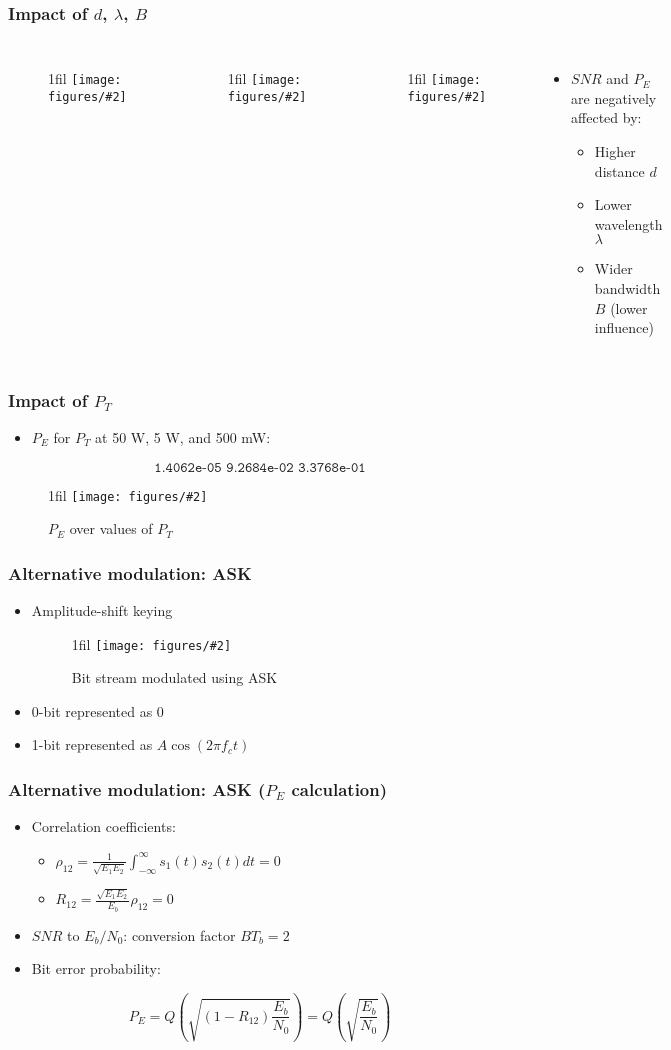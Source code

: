 \documentclass{beamer}
\makeatletter
\newcommand{\code}[1]{\texttt{#1}}
\newcommand*{\centerfloat}{%
  \parindent \z@
  \leftskip \z@ \@plus 1fil \@minus \textwidth
  \rightskip\leftskip
  \parfillskip \z@skip}
\newcommand{\fig}[3]{
  \begin{figure}[H]
  \centerfloat
    \texttt{[image: figures/\#2]}
	\caption{#3}
  \end{figure}
}
\newcommand{\figNoCapt}[2]{
  \begin{figure}[H]
  \centerfloat
    \texttt{[image: figures/\#2]}
  \end{figure}
}
\makeatother
\begin{document}
\begin{frame}
	\frametitle{Impact of $d$, $\lambda$, $B$}
	\begin{columns}
			\figNoCapt{2.75cm}{d_lambda.png}
			\figNoCapt{2.75cm}{lambda_b.png}
			\figNoCapt{2.75cm}{d_b.png}
			\begin{itemize}
				\item $SNR$ and $P_E$ are negatively affected by:
				\begin{itemize}
					\item Higher distance $d$
					\item Lower wavelength $\lambda$
					\item Wider bandwidth $B$ (lower influence)
				\end{itemize}
			\end{itemize}
	\end{columns}
\end{frame}

\begin{frame}
	\frametitle{Impact of $P_T$}
	\begin{itemize}
		\item $P_E$ for $P_T$ at 50 W, 5 W, and 500 mW:
	\end{itemize}
	\begin{equation}
		\code{1.4062e-05   9.2684e-02   3.3768e-01}
	\end{equation}
	\fig{4cm}{pe_over_pt.png}{$P_E$ over values of $P_T$}
\end{frame}

\begin{frame}
	\frametitle{Alternative modulation: ASK}
	\begin{itemize}
		\item Amplitude-shift keying
		\fig{2.5cm}{ask.png}{Bit stream modulated using ASK}
		\item 0-bit represented as 0
		\item 1-bit represented as $A\cos(2 \pi f_c t)$
	\end{itemize}
\end{frame}

\begin{frame}
	\frametitle{Alternative modulation: ASK ($P_E$ calculation)}
	\begin{itemize}
		\item Correlation coefficients:
		\begin{itemize}
			\item $\rho_{12} = \frac{1}{\sqrt{E_1 E_2}} \int_{-\infty}^{\infty} s_1(t) s_2(t) dt = 0$
			\item $R_{12} = \frac{\sqrt{E_1 E_2}}{E_b}\rho_{12} = 0$
		\end{itemize}
		\item $SNR$ to $E_b/N_0$: conversion factor $B T_b = 2$
		\item Bit error probability:
	\end{itemize}
	\begin{equation}
		P_E = Q\left(\sqrt{\left(1 - R_{12}\right) \frac{E_b}{N_0}}\right) = Q\left(\sqrt{\frac{E_b}{N_0}}\right)
	\end{equation}
\end{frame}
\end{document}
